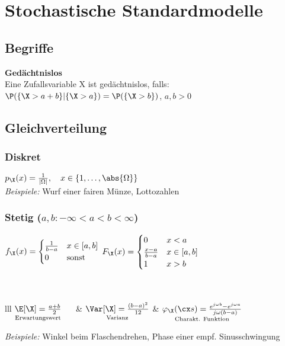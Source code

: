 \documentclass[german,color,6pt]{latex4ei/latex4ei_sheet}
\begin{document}
\section{Stochastische Standardmodelle}
\begin{sectionbox}
	\subsection{Begriffe}
	\textbf{Gedächtnislos}\\
	Eine Zufallsvariable X ist gedächtnislos, falls: \\
	$\P(\{\X > a + b\} | \{\X > a\}) = \P(\{\X > b\})$, \qquad $a,b > 0$

\end{sectionbox}
\begin{sectionbox}
	\subsection{Gleichverteilung}
	\subsubsection{Diskret}
	$p_{\X}(x) = \frac{1}{|\Omega|}, \quad x \in \left\{1,\dots,\abs{\Omega}\right\}$\\
	\emph{Beispiele:} Wurf einer fairen Münze, Lottozahlen

	\subsubsection{Stetig ($a,b: -\infty < a < b < \infty$)}
	$f_{\X}(x) = \begin{cases}
	\frac{1}{b - a} & x \in [a,b] \\
	0 & \text{sonst} \\
	\end{cases}$
	\qquad
	$F_{\X}(x) = \begin{cases}
	0 & x < a \\
	\frac{x-a}{b - a} & x \in [a,b] \\
	1 & x > b \\
	\end{cases}$
	\\ \\  \\
	\everymath{\displaystyle}
	\begin{tablebox}{lll}
		$\underset{\text{Erwartungswert}}{\E[\X] =\frac{a+b}{2}}\quad\ $ & $\underset{\text{Varianz}}{\Var[\X] =\frac{(b-a)^2}{12}}$ & $\underset{\text{Charakt. Funktion}}{\varphi_{\X}(\cx s) = \frac{e^{j \omega b}-e^{j \omega a}}{j \omega (b-a)}}$\\
	\end{tablebox}
	\emph{Beispiele:} Winkel beim Flaschendrehen, Phase einer empf. Sinusschwingung

\end{sectionbox}
\end{document}
